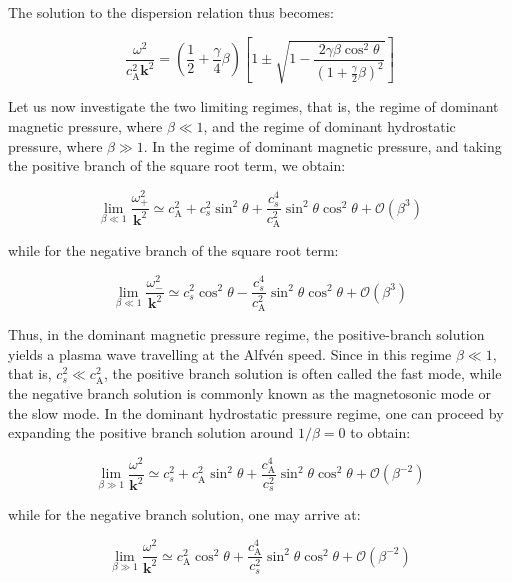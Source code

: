 The solution to the dispersion relation thus becomes:

\begin{equation}
    \frac{\omega^2}{c_\text{A}^2\mathbf{k}^2}=\left(\frac{1}{2}+\frac{\gamma}{4}\beta\right)\left[1\pm\sqrt{1-\frac{2\gamma\beta\cos^2{\theta}}{\left(1+\frac{\gamma}{2}\beta\right)^2}}\right]
\end{equation}

Let us now investigate the two limiting regimes, that is, the regime of dominant magnetic pressure, where $\beta\ll1$, and the regime of dominant hydrostatic pressure, where $\beta\gg1$. In the regime of dominant magnetic pressure, and taking the positive branch of the square root term, we obtain:

\begin{equation}
    \lim_{\beta\ll1}\frac{\omega_+^2}{\mathbf{k}^2}\simeq c_\text{A}^2+c_s^2\sin^2{\theta}+\frac{c_s^4}{c_\text{A}^2}\sin^2{\theta}\cos^2{\theta}+\mathcal{O}(\beta^3)
\end{equation}

while for the negative branch of the square root term:

\begin{equation}
    \lim_{\beta\ll1}\frac{\omega_-^2}{\mathbf{k}^2}\simeq c_s^2\cos^2{\theta}-\frac{c_s^4}{c_\text{A}^2}\sin^2{\theta}\cos^2{\theta}+\mathcal{O}(\beta^3)
\end{equation}

Thus, in the dominant magnetic pressure regime, the positive-branch solution yields a plasma wave travelling at the Alfvén speed. Since in this regime $\beta\ll1$, that is, $c_s^2\ll c_\text{A}^2$, the positive branch solution is often called the fast mode, while the negative branch solution is commonly known as the magnetosonic mode or the slow mode. In the dominant hydrostatic pressure regime, one can proceed by expanding the positive branch solution around $1/\beta=0$ to obtain:

\begin{equation}
    \lim_{\beta\gg1}\frac{\omega^2}{\mathbf{k}^2}\simeq c_s^2+c_\text{A}^2\sin^2{\theta}+\frac{c_\text{A}^4}{c_s^2}\sin^2{\theta}\cos^2{\theta}+\mathcal{O}(\beta^{-2})
\end{equation}

while for the negative branch solution, one may arrive at:

\begin{equation}
    \lim_{\beta\gg1}\frac{\omega^2}{\mathbf{k}^2}\simeq c_\text{A}^2\cos^2{\theta}+\frac{c_\text{A}^4}{c_s^2}\sin^2{\theta}\cos^2{\theta}+\mathcal{O}(\beta^{-2})
\end{equation}

